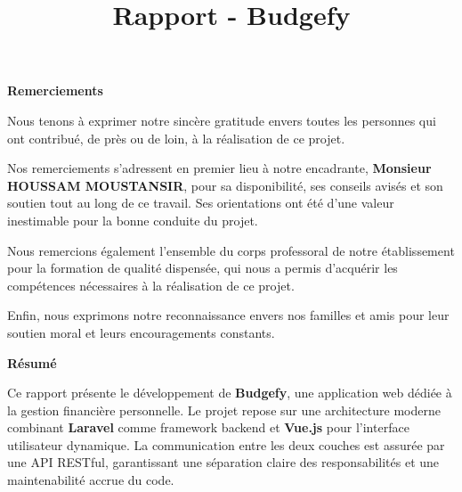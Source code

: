 \documentclass{rapportPFA}
\title{Rapport - Budgefy}
\begin{document}




\fairemarges
\fairepagedegarde


\newpage
\thispagestyle{empty}
{}
\vspace*{3cm}
\begin{center}
    {\LARGE \textbf{Remerciements}}
\end{center}
\vspace{2cm}

Nous tenons \`a exprimer notre sinc\`ere gratitude envers toutes les personnes qui ont
contribu\'e, de pr\`es ou de loin, \`a la r\'ealisation de ce projet.

Nos remerciements s'adressent en premier lieu \`a notre encadrante,
\textbf{Monsieur HOUSSAM MOUSTANSIR}, pour sa disponibilit\'e, ses conseils avis\'es
et son soutien tout au long de ce travail. Ses orientations ont \'et\'e d'une valeur
inestimable pour la bonne conduite du projet.

Nous remercions \'egalement l'ensemble du corps professoral de notre \'etablissement
pour la formation de qualit\'e dispens\'ee, qui nous a permis d'acqu\'erir les
comp\'etences n\'ecessaires \`a la r\'ealisation de ce projet.

Enfin, nous exprimons notre reconnaissance envers nos familles et amis pour leur
soutien moral et leurs encouragements constants.

\newpage
\thispagestyle{empty}
{}
\vspace*{3cm}
\begin{center}
    {\LARGE \textbf{R\'esum\'e}}
\end{center}
\vspace{2cm}

Ce rapport pr\'esente le d\'eveloppement de \textbf{Budgefy}, une application web
d\'edi\'ee \`a la gestion financi\`ere personnelle. Le projet repose sur une architecture
moderne combinant \textbf{Laravel} comme framework backend et \textbf{Vue.js} pour
l'interface utilisateur dynamique. La communication entre les deux couches est assur\'ee
par une API RESTful, garantissant une s\'eparation claire des responsabilit\'es et une
maintenabilit\'e accrue du code.
\end{document}
